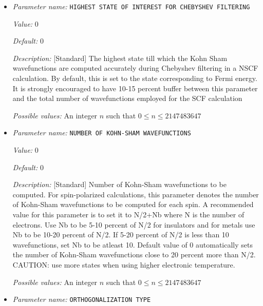 \begin{itemize}
{\it Possible values:} A boolean value (true or false)
\item {\it Parameter name:} {\tt HIGHEST STATE OF INTEREST FOR CHEBYSHEV FILTERING}
\label{parameters:SCF parameters/Eigen_2dsolver parameters/HIGHEST STATE OF INTEREST FOR CHEBYSHEV FILTERING}
\label{parameters:SCF_20parameters/Eigen_2dsolver_20parameters/HIGHEST_20STATE_20OF_20INTEREST_20FOR_20CHEBYSHEV_20FILTERING}


{\it Value:} 0


{\it Default:} 0


{\it Description:} [Standard] The highest state till which the Kohn Sham wavefunctions are computed accurately during Chebyshev filtering in a NSCF calculation. By default, this is set to the state corresponding to Fermi energy. It is strongly encouraged to have 10-15 percent buffer between this parameter and the total number of wavefunctions employed for the SCF calculation 


{\it Possible values:} An integer $n$ such that $0\leq n \leq 2147483647$
\item {\it Parameter name:} {\tt NUMBER OF KOHN-SHAM WAVEFUNCTIONS}
\label{parameters:SCF parameters/Eigen_2dsolver parameters/NUMBER OF KOHN_2dSHAM WAVEFUNCTIONS}
\label{parameters:SCF_20parameters/Eigen_2dsolver_20parameters/NUMBER_20OF_20KOHN_2dSHAM_20WAVEFUNCTIONS}


{\it Value:} 0


{\it Default:} 0


{\it Description:} [Standard] Number of Kohn-Sham wavefunctions to be computed. For spin-polarized calculations, this parameter denotes the number of Kohn-Sham wavefunctions to be computed for each spin. A recommended value for this parameter is to set it to N/2+Nb where N is the number of electrons. Use Nb to be 5-10 percent of N/2 for insulators and for metals use Nb to be 10-20 percent of N/2. If 5-20 percent of N/2 is less than 10 wavefunctions, set Nb to be atleast 10. Default value of 0 automatically sets the number of Kohn-Sham wavefunctions close to 20 percent more than N/2. CAUTION: use more states when using higher electronic temperature.


{\it Possible values:} An integer $n$ such that $0\leq n \leq 2147483647$
\item {\it Parameter name:} {\tt ORTHOGONALIZATION TYPE}
\label{parameters:SCF parameters/Eigen_2dsolver parameters/ORTHOGONALIZATION TYPE}
\label{parameters:SCF_20parameters/Eigen_2dsolver_20parameters/ORTHOGONALIZATION_20TYPE}



\end{itemize}
